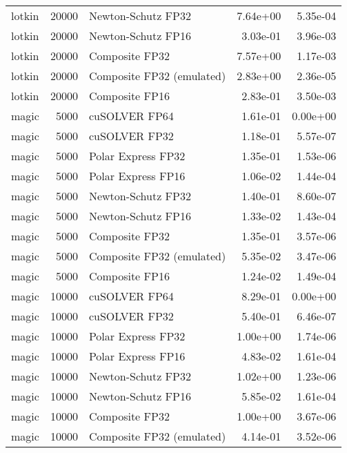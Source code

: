 \begin{table}
\begin{tabular}{lrlrr}
   lotkin & 20000 &        Newton-Schutz FP32 &  7.64e+00 &        5.35e-04 \\
   lotkin & 20000 &        Newton-Schutz FP16 &  3.03e-01 &        3.96e-03 \\
   lotkin & 20000 &            Composite FP32 &  7.57e+00 &        1.17e-03 \\
   lotkin & 20000 & Composite FP32 (emulated) &  2.83e+00 &        2.36e-05 \\
   lotkin & 20000 &            Composite FP16 &  2.83e-01 &        3.50e-03 \\
    magic &  5000 &             cuSOLVER FP64 &  1.61e-01 &        0.00e+00 \\
    magic &  5000 &             cuSOLVER FP32 &  1.18e-01 &        5.57e-07 \\
    magic &  5000 &        Polar Express FP32 &  1.35e-01 &        1.53e-06 \\
    magic &  5000 &        Polar Express FP16 &  1.06e-02 &        1.44e-04 \\
    magic &  5000 &        Newton-Schutz FP32 &  1.40e-01 &        8.60e-07 \\
    magic &  5000 &        Newton-Schutz FP16 &  1.33e-02 &        1.43e-04 \\
    magic &  5000 &            Composite FP32 &  1.35e-01 &        3.57e-06 \\
    magic &  5000 & Composite FP32 (emulated) &  5.35e-02 &        3.47e-06 \\
    magic &  5000 &            Composite FP16 &  1.24e-02 &        1.49e-04 \\
    magic & 10000 &             cuSOLVER FP64 &  8.29e-01 &        0.00e+00 \\
    magic & 10000 &             cuSOLVER FP32 &  5.40e-01 &        6.46e-07 \\
    magic & 10000 &        Polar Express FP32 &  1.00e+00 &        1.74e-06 \\
    magic & 10000 &        Polar Express FP16 &  4.83e-02 &        1.61e-04 \\
    magic & 10000 &        Newton-Schutz FP32 &  1.02e+00 &        1.23e-06 \\
    magic & 10000 &        Newton-Schutz FP16 &  5.85e-02 &        1.61e-04 \\
    magic & 10000 &            Composite FP32 &  1.00e+00 &        3.67e-06 \\
    magic & 10000 & Composite FP32 (emulated) &  4.14e-01 &        3.52e-06 \\

\end{tabular}
\end{table}
